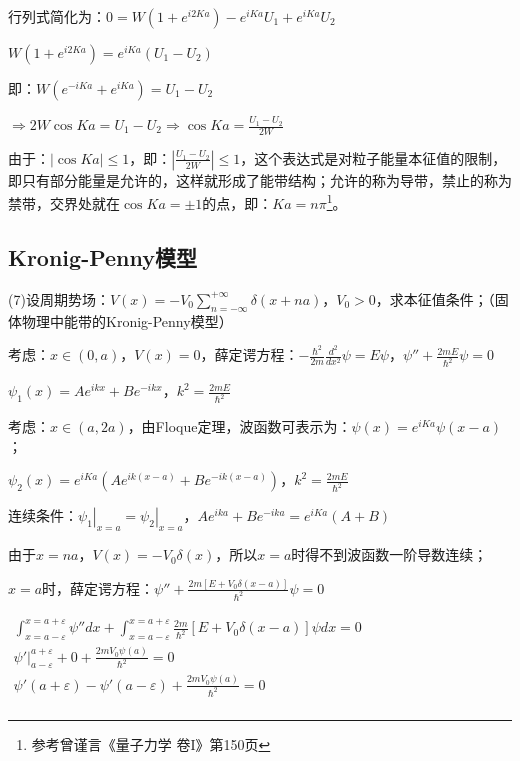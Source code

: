 行列式简化为：$0 = W\left( {1 + e^{i2Ka} } \right) - e^{iKa} U_1  + e^{iKa} U_2 $

$W\left( {1 + e^{i2Ka} } \right) = e^{iKa} \left( {U_1  - U_2 } \right)$

即：$W\left( {e^{ - iKa}  + e^{iKa} } \right) = U_1  - U_2 $

$ \Rightarrow 2W\cos Ka = U_1  - U_2  \Rightarrow \cos Ka = \frac{{U_1  - U_2 }}{{2W}}$

由于：$\left| {\cos Ka} \right| \le 1$，即：$\left| {\frac{{U_1  - U_2 }}{{2W}}} \right| \le 1$，这个表达式是对粒子能量本征值的限制，即只有部分能量是允许的，这样就形成了能带结构；允许的称为导带，禁止的称为禁带，交界处就在$\cos Ka =  \pm 1$的点，即：$Ka = n\pi $\footnote{参考曾谨言《量子力学 卷I》第150页}。


\subsection{Kronig-Penny模型}

(7)设周期势场：$V(x) =  - V_0 \sum\limits_{n =  - \infty }^{ + \infty } {\delta \left( {x + na} \right)} $，$V_0  > 0$，求本征值条件；（固体物理中能带的Kronig-Penny模型）

考虑：$x \in \left( {0,a} \right)$，$V(x) = 0$，薛定谔方程：$ - \frac{{\hbar ^2 }}{{2m}}\frac{{d^2 }}{{dx^2 }}\psi  = E\psi $，$\psi '' + \frac{{2mE}}{{\hbar ^2 }}\psi  = 0$

$\psi _1 \left( x \right) = Ae^{ikx}  + Be^{ - ikx} $，$k^2  = \frac{{2mE}}{{\hbar ^2 }}$

考虑：$x \in \left( {a,2a} \right)$，由Floque定理，波函数可表示为：$\psi \left( x \right) = e^{iKa} \psi \left( {x - a} \right)$；

$\psi _2 \left( x \right) = e^{iKa} \left( {Ae^{ik(x - a)}  + Be^{ - ik(x - a)} } \right)$，$k^2  = \frac{{2mE}}{{\hbar ^2 }}$

连续条件：$\left. {\psi _1 } \right|_{x = a}  = \left. {\psi _2 } \right|_{x = a} $，$Ae^{ika}  + Be^{ - ika}  = e^{iKa} \left( {A + B} \right)$

由于$x = na$，$V(x) =  - V_0 \delta (x)$，所以$x = a$时得不到波函数一阶导数连续；

$x = a$时，薛定谔方程：$\psi '' + \frac{{2m\left[ {E + V_0 \delta (x - a)} \right]}}{{\hbar ^2 }}\psi  = 0$

$\begin{array}{l}
 \int_{x = a - \varepsilon }^{x = a + \varepsilon } {\psi ''dx}  + \int_{x = a - \varepsilon }^{x = a + \varepsilon } {\frac{{2m}}{{\hbar ^2 }}\left[ {E + V_0 \delta (x - a)} \right]\psi dx}  = 0 \\
 \left. {\psi '} \right|_{a - \varepsilon }^{a + \varepsilon }  + 0 + \frac{{2mV_0 \psi (a)}}{{\hbar ^2 }} = 0 \\
 \psi '(a + \varepsilon ) - \psi '(a - \varepsilon ) + \frac{{2mV_0 \psi (a)}}{{\hbar ^2 }} = 0 \\
 \end{array}$

